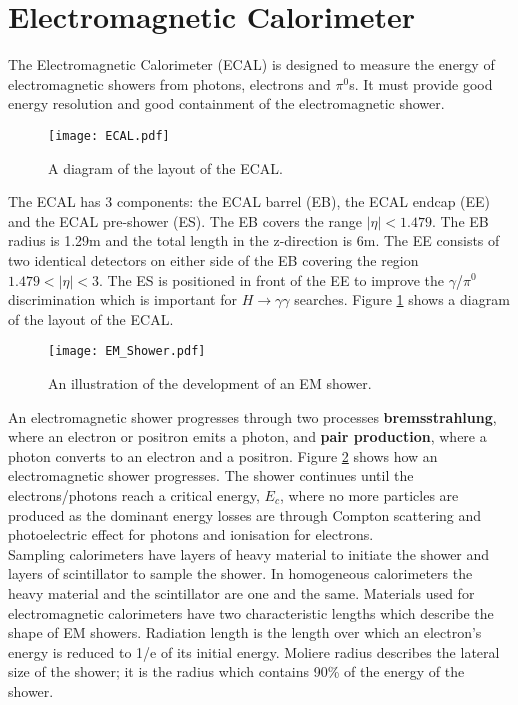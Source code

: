 \section{Electromagnetic Calorimeter}

The Electromagnetic Calorimeter (ECAL) is designed to measure the energy of
electromagnetic showers from photons, electrons and $\pi^{0}$s. It must provide
good energy resolution and good containment of the electromagnetic shower. \\

\begin{figure}
\begin{center}
\texttt{[image: ECAL.pdf]}
\end{center}
\caption{A diagram of the layout of the ECAL.}
\label{fig:ECAL}
\end{figure}

The ECAL has 3 components: the ECAL barrel (EB), the ECAL endcap (EE) and the
ECAL pre-shower (ES). The EB covers the range $|\eta| < 1.479$. The EB radius is
1.29m and the total length in the z-direction is 6m. The EE consists of two 
identical detectors on either side of the EB covering the region $1.479 < |\eta|
< 3$. The ES is positioned in front of the EE to improve the $\gamma$/$\pi^{0}$ 
discrimination which is important for $H\rightarrow\gamma\gamma$ searches. 
Figure \ref{fig:ECAL} shows a diagram of the layout of the ECAL. \\

\begin{figure}
\begin{center}
\texttt{[image: EM\_Shower.pdf]}
\end{center}
\caption{An illustration of the development of an EM shower.}
\label{fig:em_shower}
\end{figure}

An electromagnetic shower progresses through two processes {\bf bremsstrahlung},
where an electron or positron emits a photon, and {\bf pair production}, where a
photon converts to an electron and a positron. Figure \ref{fig:em_shower} shows
how an electromagnetic shower progresses. The shower continues until the
electrons/photons reach a critical energy, $E_{c}$, where no more particles are 
produced as the dominant energy losses are through Compton scattering and
photoelectric effect for photons and ionisation for electrons. \\

Sampling calorimeters have layers of heavy material to initiate the shower and 
layers of scintillator to sample the shower. In homogeneous calorimeters the 
heavy material and the scintillator are one and the same. Materials used for
electromagnetic calorimeters have two characteristic lengths which describe the 
shape of EM showers. Radiation length is the length over which an electron's 
energy is reduced to 1/e of its initial energy. Moliere radius describes the 
lateral size of the shower; it is the radius which contains 90\% of the energy 
of the shower. \\  

